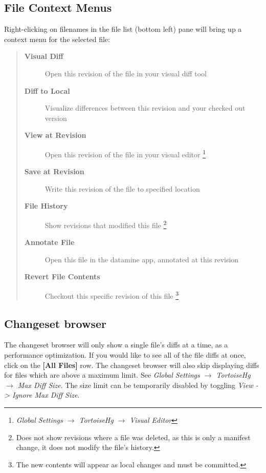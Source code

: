 \documentclass[letterpaper,10pt,english]{manual}
\begin{document}
\subsection{File Context Menus}

Right-clicking on filenames in the file list (bottom left) pane will
bring up a context menu for the selected file:
\begin{quote}
\begin{description}
\item[\textbf{Visual Diff}]
Open this revision of the file in your visual diff tool

\item[\textbf{Diff to Local}]
Visualize differences between this revision and your checked
out version

\item[\textbf{View at Revision}]
Open this revision of the file in your visual editor \footnote{
\emph{Global Settings \(\rightarrow\) TortoiseHg \(\rightarrow\) Visual Editor}
}

\item[\textbf{Save at Revision}]
Write this revision of the file to specified location

\item[\textbf{File History}]
Show revisions that modified this file \footnote{
Does not show revisions where a file was deleted, as this is only a
manifest change, it does not modify the file's history.
}

\item[\textbf{Annotate File}]
Open this file in the datamine app, annotated at this revision

\item[\textbf{Revert File Contents}]
Checkout this specific revision of this file \footnote{
The new contents will appear as local changes and must be committed.
}

\end{description}
\end{quote}


\subsection{Changeset browser}

The changeset browser will only show a single file's diffs at a time, as
a performance optimization.  If you would like to see all of the file
diffs at once, click on the \textbf{{[}All Files{]}} row.  The changeset
browser will also skip displaying diffs for files which are above a
maximum limit. See
\emph{Global Settings \(\rightarrow\) TortoiseHg \(\rightarrow\) Max Diff Size}.  The
size limit can be temporarily disabled by toggling \emph{View
-\textgreater{} Ignore Max Diff Size}.
\end{document}
